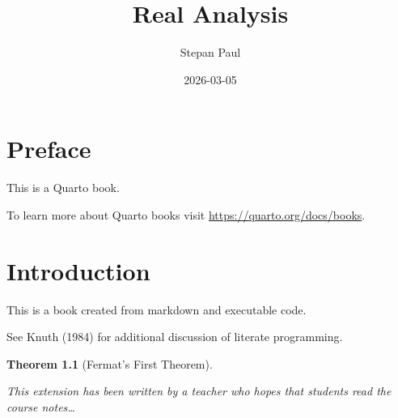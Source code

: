 \documentclass[
  letterpaper,
  DIV=11,
  numbers=noendperiod]{scrreprt}
\title{Real Analysis}
\author{Stepan Paul}
\date{2026-03-05}
\renewcommand*\contentsname{Table of contents}
\newcommand\contentsname{Table of contents}
\theoremstyle{plain}
\newtheorem{theorem}{Theorem}[chapter]
\theoremstyle{definition}
\theoremstyle{plain}
\theoremstyle{plain}
\theoremstyle{definition}
\theoremstyle{definition}
\theoremstyle{remark}
\begin{document}
\maketitle

\makeatletter
{}
\makeatother

\renewcommand*\contentsname{Table of contents}
{
\hypersetup{linkcolor=}
\setcounter{tocdepth}{2}
\tableofcontents
}


\chapter*{Preface}\label{preface}


This is a Quarto book.

To learn more about Quarto books visit
\url{https://quarto.org/docs/books}.


\chapter{Introduction}\label{introduction}

This is a book created from markdown and executable code.

See Knuth (1984) for additional discussion of literate programming.

\begin{theorem}[Fermat's First
Theorem]\protect\hypertarget{thm-hi}{}\label{thm-hi}

This extension has been written by a teacher who hopes that students
read the course notes\ldots{}

\end{theorem}
\end{document}
